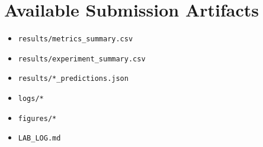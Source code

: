 \documentclass[11pt,a4paper]{article}
\begin{document}
\section*{Available Submission Artifacts}

\begin{itemize}[leftmargin=*]
    \item \texttt{results/metrics\_summary.csv}
    \item \texttt{results/experiment\_summary.csv}
    \item \texttt{results/*\_predictions.json}
    \item \texttt{logs/*}
    \item \texttt{figures/*}
    \item \texttt{LAB\_LOG.md}
\end{itemize}
\end{document}
